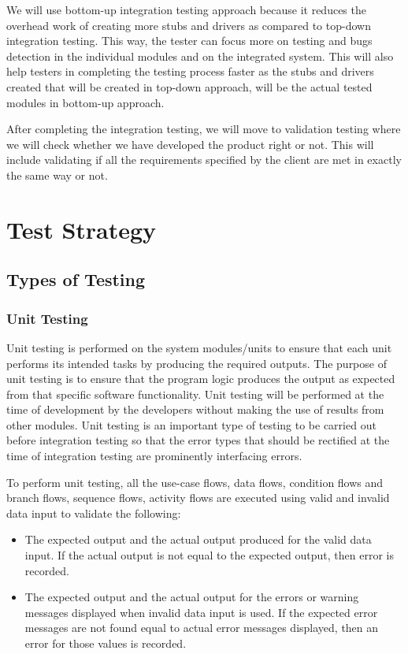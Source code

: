 \documentclass[12pt]{article}
\begin{document}
We will use bottom-up integration testing approach because it reduces the overhead work of creating more stubs and drivers as compared to top-down integration testing. This way, the tester can focus more on testing and bugs detection in the individual modules and on the integrated system. This will also help testers in completing the testing process faster as the stubs and drivers created that will be created in top-down approach, will be the actual tested modules in bottom-up approach.

After completing the integration testing, we will move to validation testing where we will check whether we have developed the product right or not. This will include validating if all the requirements specified by the client are met in exactly the same way or not.


\section{Test Strategy}
	
\subsection{Types of Testing}
		
\subsubsection{Unit Testing}
Unit testing is performed on the system modules/units to ensure that each unit performs its intended tasks by producing the required outputs. The purpose of unit testing is to ensure that the program logic produces the output as expected from that specific software functionality. Unit testing will be performed at the time of development by the developers without making the use of results from other modules. Unit testing is an important type of testing to be carried out before integration testing so that the error types that should be rectified at the time of integration testing are prominently interfacing errors.

To perform unit testing, all the use-case flows, data flows, condition flows and branch flows, sequence flows, activity flows are executed using valid and invalid data input to validate the following:
\begin{itemize}
    

    \item The expected output and the actual output produced for the valid data input. If the actual output is not equal to the expected output, then error is recorded.
    \item The expected output and the actual output for the errors or warning messages displayed when invalid data input is used. If the expected error messages are not found equal to actual error messages displayed, then an error for those values is recorded.
 \end{itemize}
\end{document}
